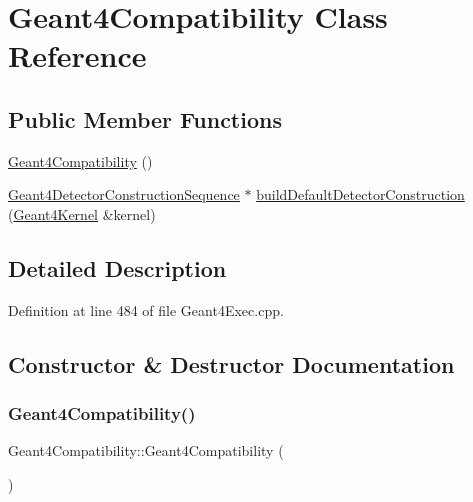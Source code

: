 \hypertarget{class_geant4_compatibility}{}\section{Geant4\+Compatibility Class Reference}
\label{class_geant4_compatibility}
\subsection*{Public Member Functions}
\begin{DoxyCompactItemize}
\item 
\hyperlink{class_geant4_compatibility_a8dc4d9bd93a45cb3524b317ba8cdbc8e}{Geant4\+Compatibility} ()
\item 
\hyperlink{class_d_d4hep_1_1_simulation_1_1_geant4_detector_construction_sequence}{Geant4\+Detector\+Construction\+Sequence} $\ast$ \hyperlink{class_geant4_compatibility_abe1c52fe3962756ab59bc3cdde7edca2}{build\+Default\+Detector\+Construction} (\hyperlink{class_d_d4hep_1_1_simulation_1_1_geant4_kernel}{Geant4\+Kernel} \&kernel)
\end{DoxyCompactItemize}


\subsection{Detailed Description}


Definition at line 484 of file Geant4\+Exec.\+cpp.



\subsection{Constructor \& Destructor Documentation}
\hypertarget{class_geant4_compatibility_a8dc4d9bd93a45cb3524b317ba8cdbc8e}{}\label{class_geant4_compatibility_a8dc4d9bd93a45cb3524b317ba8cdbc8e} 
\subsubsection{\texorpdfstring{Geant4\+Compatibility()}{Geant4Compatibility()}}
{\footnotesize\ttfamily Geant4\+Compatibility\+::\+Geant4\+Compatibility (\begin{DoxyParamCaption}{ }\end{DoxyParamCaption})\hspace{0.3cm}{\ttfamily [inline]}}



